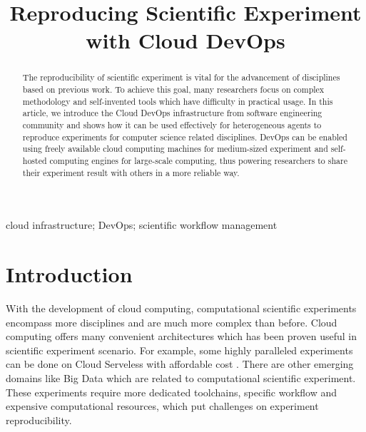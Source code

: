 \documentclass[10pt, conference, compsocconf]{IEEEtran}
\begin{document}
\title{Reproducing Scientific Experiment with Cloud DevOps}

\author{
\and
{}
\and
{}
\and
{}
}
\maketitle
\begin{abstract}
The reproducibility of scientific experiment is vital for the advancement of disciplines based on previous work. To achieve this goal, many researchers focus on complex methodology and self-invented tools which have difficulty in practical usage. In this article, we introduce the Cloud DevOps infrastructure from software engineering community and shows how it can be used effectively for heterogeneous agents to reproduce experiments for computer science related disciplines. DevOps can be enabled using freely available cloud computing machines for medium-sized experiment and self-hosted computing engines for large-scale computing, thus powering researchers to share their experiment result with others in a more reliable way.
\end{abstract}
\begin{IEEEkeywords}
cloud infrastructure; DevOps; scientific workflow management
\end{IEEEkeywords}

\section{Introduction}
With the development of cloud computing, computational scientific experiments encompass more disciplines and are much more complex than before. Cloud computing offers many convenient architectures which has been proven useful in scientific experiment scenario.  For example, some highly paralleled experiments can be done on Cloud Serveless with affordable cost \cite{niu2019leveraging}. There are other emerging domains like Big Data which are related to computational scientific experiment. These experiments require more dedicated toolchains, specific workflow and expensive computational resources, which put challenges on experiment reproducibility.
\end{document}
